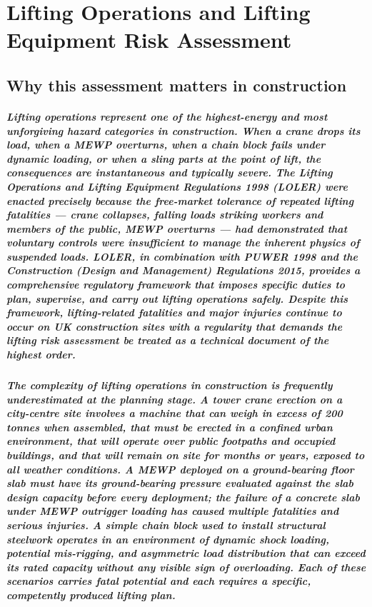 \chapter{Lifting Operations and Lifting Equipment Risk Assessment}
\label{chap:Lifting Operations and Lifting Equipment Risk Assessment}

\section{Why this assessment matters in construction}

\paragraph{Lifting operations represent one of the highest-energy and most unforgiving hazard categories in construction. When a crane drops its load, when a MEWP overturns, when a chain block fails under dynamic loading, or when a sling parts at the point of lift, the consequences are instantaneous and typically severe. The Lifting Operations and Lifting Equipment Regulations 1998 (LOLER) were enacted precisely because the free-market tolerance of repeated lifting fatalities --- crane collapses, falling loads striking workers and members of the public, MEWP overturns --- had demonstrated that voluntary controls were insufficient to manage the inherent physics of suspended loads. LOLER, in combination with PUWER 1998 and the Construction (Design and Management) Regulations 2015, provides a comprehensive regulatory framework that imposes specific duties to plan, supervise, and carry out lifting operations safely. Despite this framework, lifting-related fatalities and major injuries continue to occur on UK construction sites with a regularity that demands the lifting risk assessment be treated as a technical document of the highest order.}

\paragraph{The complexity of lifting operations in construction is frequently underestimated at the planning stage. A tower crane erection on a city-centre site involves a machine that can weigh in excess of 200 tonnes when assembled, that must be erected in a confined urban environment, that will operate over public footpaths and occupied buildings, and that will remain on site for months or years, exposed to all weather conditions. A MEWP deployed on a ground-bearing floor slab must have its ground-bearing pressure evaluated against the slab design capacity before every deployment; the failure of a concrete slab under MEWP outrigger loading has caused multiple fatalities and serious injuries. A simple chain block used to install structural steelwork operates in an environment of dynamic shock loading, potential mis-rigging, and asymmetric load distribution that can exceed its rated capacity without any visible sign of overloading. Each of these scenarios carries fatal potential and each requires a specific, competently produced lifting plan.}

